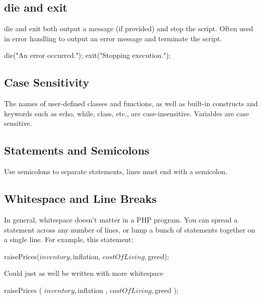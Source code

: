 \documentclass{report}
\begin{document}
    \bigbreak \noindent 
    \subsection{die and exit}
    \bigbreak \noindent 
    die and exit both output a message (if provided) and stop the script.
    \bigbreak \noindent 
    Often used in error handling to output an error message and terminate the script.
    \bigbreak \noindent 
    \begin{phpcode}
        die("An error occurred.");
        exit("Stopping execution.");
    \end{phpcode}












    \pagebreak 
    \bigbreak \noindent 
    \subsection{Case Sensitivity}
    \bigbreak \noindent 
    The names of user-defined classes and functions, as well as built-in constructs and keywords such as echo, while, class, etc., are case-insensitive.
    \bigbreak \noindent 
    Variables are case sensitive.
    \bigbreak \noindent 
    \subsection{Statements and Semicolons}
    \bigbreak \noindent 
    Use semicolons to separate statements, lines must end with a semicolon.
    \bigbreak \noindent 
    \subsection{Whitespace and Line Breaks}
    \bigbreak \noindent 
    In general, whitespace doesn’t matter in a PHP program. You can spread a statement across any number of lines, or lump a bunch of statements together on a single line. For example, this statement:
    \bigbreak \noindent 
    \begin{phpcode}
    raisePrices($inventory, $inflation, $costOfLiving, $greed);
    \end{phpcode}
    \bigbreak \noindent 
    Could just as well be written with more whitespace
    \bigbreak \noindent 
    \begin{phpcode}
        raisePrices (
            $inventory ,
            $inflation ,
            $costOfLiving ,
            $greed
        );
    \end{phpcode}
    \bigbreak \noindent 
\end{document}

